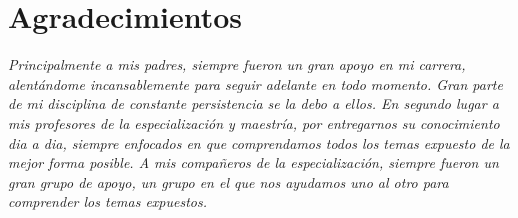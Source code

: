 \chapter*{Agradecimientos}

\hfill \textit{Principalmente a mis padres, siempre fueron un gran apoyo en mi carrera, alentándome incansablemente para seguir adelante en todo momento. Gran parte de mi disciplina de constante persistencia se la debo a ellos. En segundo lugar a mis profesores de la especialización y maestría, por entregarnos su conocimiento dia a dia, siempre enfocados en que comprendamos todos los temas expuesto de la mejor forma posible. A mis compañeros de la especialización, siempre fueron un gran grupo de apoyo, un grupo en el que nos ayudamos uno al otro para comprender los temas expuestos.}
